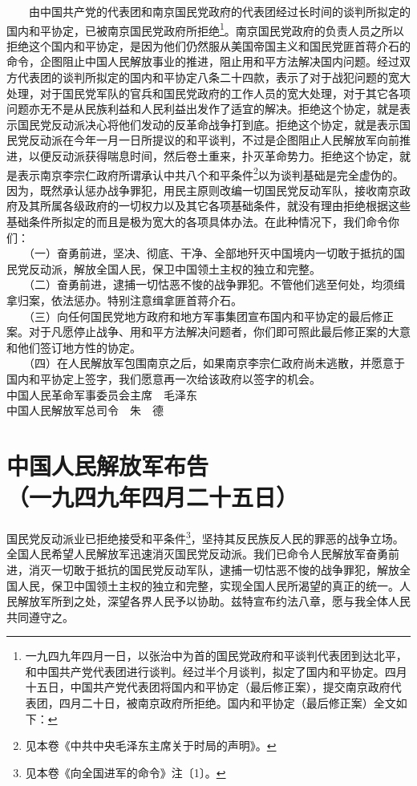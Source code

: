 \documentclass[cn,11pt,chinese]{elegantbook}
\def\myformat#1{\hfil\hfil #1}
\begin{document}
　　由中国共产党的代表团和南京国民党政府的代表团经过长时间的谈判所拟定的国内和平协定，已被南京国民党政府所拒绝\footnote[1]{ 一九四九年四月一日，以张治中为首的国民党政府和平谈判代表团到达北平，和中国共产党代表团进行谈判。经过半个月谈判，拟定了国内和平协定。四月十五日，中国共产党代表团将国内和平协定（最后修正案），提交南京政府代表团，四月二十日，被南京政府所拒绝。国内和平协定（最后修正案）全文如下：}。南京国民党政府的负责人员之所以拒绝这个国内和平协定，是因为他们仍然服从美国帝国主义和国民党匪首蒋介石的命令，企图阻止中国人民解放事业的推进，阻止用和平方法解决国内问题。经过双方代表团的谈判所拟定的国内和平协定八条二十四款，表示了对于战犯问题的宽大处理，对于国民党军队的官兵和国民党政府的工作人员的宽大处理，对于其它各项问题亦无不是从民族利益和人民利益出发作了适宜的解决。拒绝这个协定，就是表示国民党反动派决心将他们发动的反革命战争打到底。拒绝这个协定，就是表示国民党反动派在今年一月一日所提议的和平谈判，不过是企图阻止人民解放军向前推进，以便反动派获得喘息时间，然后卷土重来，扑灭革命势力。拒绝这个协定，就是表示南京李宗仁政府所谓承认中共八个和平条件\footnote[2]{ 见本卷《中共中央毛泽东主席关于时局的声明》。}以为谈判基础是完全虚伪的。因为，既然承认惩办战争罪犯，用民主原则改编一切国民党反动军队，接收南京政府及其所属各级政府的一切权力以及其它各项基础条件，就没有理由拒绝根据这些基础条件所拟定的而且是极为宽大的各项具体办法。在此种情况下，我们命令你们：\\
　　（一）奋勇前进，坚决、彻底、干净、全部地歼灭中国境内一切敢于抵抗的国民党反动派，解放全国人民，保卫中国领土主权的独立和完整。\\
　　（二）奋勇前进，逮捕一切怙恶不悛的战争罪犯。不管他们逃至何处，均须缉拿归案，依法惩办。特别注意缉拿匪首蒋介石。\\
　　（三）向任何国民党地方政府和地方军事集团宣布国内和平协定的最后修正案。对于凡愿停止战争、用和平方法解决问题者，你们即可照此最后修正案的大意和他们签订地方性的协定。\\
　　（四）在人民解放军包围南京之后，如果南京李宗仁政府尚未逃散，并愿意于国内和平协定上签字，我们愿意再一次给该政府以签字的机会。\\
中国人民革命军事委员会主席　毛泽东\\
中国人民解放军总司令　朱　德\\
\newpage\section*{\myformat{中国人民解放军布告}\\\myformat{（一九四九年四月二十五日）}}
国民党反动派业已拒绝接受和平条件\footnote[1]{ 见本卷《向全国进军的命令》注〔1〕。}，坚持其反民族反人民的罪恶的战争立场。全国人民希望人民解放军迅速消灭国民党反动派。我们已命令人民解放军奋勇前进，消灭一切敢于抵抗的国民党反动军队，逮捕一切怙恶不悛的战争罪犯，解放全国人民，保卫中国领土主权的独立和完整，实现全国人民所渴望的真正的统一。人民解放军所到之处，深望各界人民予以协助。兹特宣布约法八章，愿与我全体人民共同遵守之。\\
\end{document}
